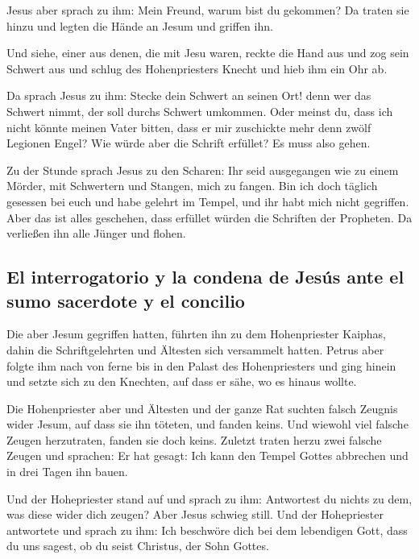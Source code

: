  Jesus aber sprach zu ihm: Mein Freund, warum bist du
gekommen? Da traten sie hinzu und legten die Hände an Jesum und griffen
ihn.

 Und siehe, einer aus denen, die mit Jesu waren, reckte
die Hand aus und zog sein Schwert aus und schlug des Hohenpriesters
Knecht und hieb ihm ein Ohr ab.

 Da sprach Jesus zu ihm: Stecke dein Schwert an seinen
Ort! denn wer das Schwert nimmt, der soll durchs Schwert umkommen.
 Oder meinst du, dass ich nicht könnte meinen Vater
bitten, dass er mir zuschickte mehr denn zwölf Legionen Engel?
 Wie würde aber die Schrift erfüllet? Es muss also gehen.

 Zu der Stunde sprach Jesus zu den Scharen: Ihr seid
ausgegangen wie zu einem Mörder, mit Schwertern und Stangen, mich zu
fangen. Bin ich doch täglich gesessen bei euch und habe gelehrt im
Tempel, und ihr habt mich nicht gegriffen.  Aber das ist
alles geschehen, dass erfüllet würden die Schriften der Propheten. Da
verließen ihn alle Jünger und flohen.

\hypertarget{el-interrogatorio-y-la-condena-de-jesuxfas-ante-el-sumo-sacerdote-y-el-concilio}{%
\subsection{El interrogatorio y la condena de Jesús ante el sumo
sacerdote y el
concilio}\label{el-interrogatorio-y-la-condena-de-jesuxfas-ante-el-sumo-sacerdote-y-el-concilio}}

 Die aber Jesum gegriffen hatten, führten ihn zu dem
Hohenpriester Kaiphas, dahin die Schriftgelehrten und Ältesten sich
versammelt hatten.  Petrus aber folgte ihm nach von ferne
bis in den Palast des Hohenpriesters und ging hinein und setzte sich zu
den Knechten, auf dass er sähe, wo es hinaus wollte.

 Die Hohenpriester aber und Ältesten und der ganze Rat
suchten falsch Zeugnis wider Jesum, auf dass sie ihn töteten,
 und fanden keins. Und wiewohl viel falsche Zeugen
herzutraten, fanden sie doch keins. Zuletzt traten herzu zwei falsche
Zeugen  und sprachen: Er hat gesagt: Ich kann den Tempel
Gottes abbrechen und in drei Tagen ihn bauen.

 Und der Hohepriester stand auf und sprach zu ihm:
Antwortest du nichts zu dem, was diese wider dich zeugen?
 Aber Jesus schwieg still. Und der Hohepriester
antwortete und sprach zu ihm: Ich beschwöre dich bei dem lebendigen
Gott, dass du uns sagest, ob du seist Christus, der Sohn Gottes.

